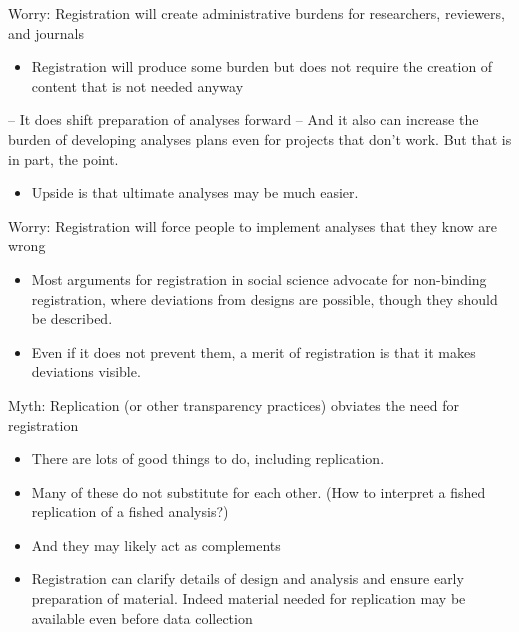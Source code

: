 \documentclass[
  11pt,
  ignorenonframetext,
]{beamer}
\providecommand{\tightlist}{%
  \setlength{\itemsep}{0pt}\setlength{\parskip}{0pt}}\usepackage{longtable,booktabs,array}
\begin{document}
\begin{frame}{Worry: Registration will create administrative burdens for
researchers, reviewers, and journals}
\protect\hypertarget{worry-registration-will-create-administrative-burdens-for-researchers-reviewers-and-journals}{}
\begin{itemize}
\tightlist
\item
  Registration will produce some burden but does not require the
  creation of content that is not needed anyway
\end{itemize}

-- It does shift preparation of analyses forward -- And it also can
increase the burden of developing analyses plans even for projects that
don't work. But that is in part, the point.

\begin{itemize}
\tightlist
\item
  Upside is that ultimate analyses may be much easier.
\end{itemize}
\end{frame}

\begin{frame}{Worry: Registration will force people to implement
analyses that they know are wrong}
\protect\hypertarget{worry-registration-will-force-people-to-implement-analyses-that-they-know-are-wrong}{}
\begin{itemize}
\tightlist
\item
  Most arguments for registration in social science advocate for
  non-binding registration, where deviations from designs are possible,
  though they should be described.
\item
  Even if it does not prevent them, a merit of registration is that it
  makes deviations visible.
\end{itemize}
\end{frame}

\begin{frame}{Myth: Replication (or other transparency practices)
obviates the need for registration}
\protect\hypertarget{myth-replication-or-other-transparency-practices-obviates-the-need-for-registration}{}
\begin{itemize}
\tightlist
\item
  There are lots of good things to do, including replication.
\item
  Many of these do not substitute for each other. (How to interpret a
  fished replication of a fished analysis?)
\item
  And they may likely act as complements
\item
  Registration can clarify details of design and analysis and ensure
  early preparation of material. Indeed material needed for replication
  may be available even before data collection
\end{itemize}
\end{frame}
\end{document}
